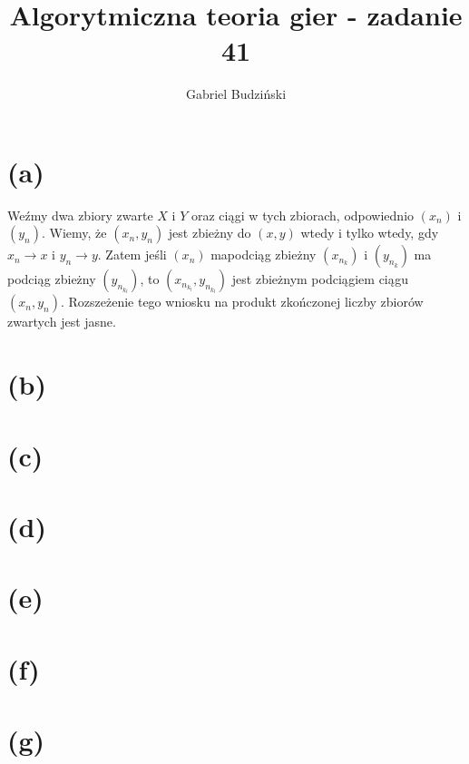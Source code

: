 \documentclass{article}
\title{Algorytmiczna teoria gier {-} zadanie 41}
\author{Gabriel Budziński}
\begin{document}
\maketitle

\section*{(a)}

Weźmy dwa zbiory zwarte $X$ i $Y$ oraz ciągi w tych zbiorach, odpowiednio $(x_n)$ i $(y_n)$. Wiemy, że $(x_n, y_n)$ jest zbieżny do $(x, y)$ wtedy i tylko wtedy, gdy $x_n \rightarrow x$ i $y_n \rightarrow y$. Zatem jeśli $(x_n)$ mapodciąg zbieżny $(x_{n_k})$ i $(y_{n_k})$ ma podciąg zbieżny $(y_{n_{k_l}})$, to $(x_{n_{k_l}}, y_{n_{k_l}})$ jest zbieżnym podciągiem ciągu $(x_n, y_n)$. Rozszeżenie tego wniosku na produkt zkończonej liczby zbiorów zwartych jest jasne.

\section*{(b)}


\section*{(c)}


\section*{(d)}


\section*{(e)}


\section*{(f)}


\section*{(g)}
\end{document}
